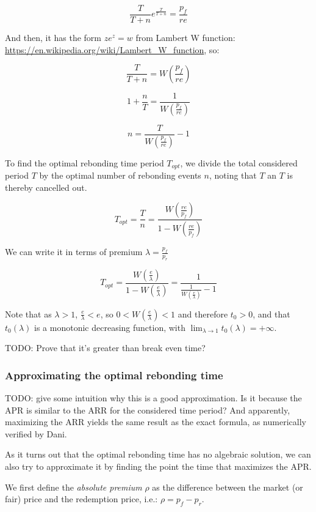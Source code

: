 \documentclass{article}
\begin{document}
\[
\frac{T}{T+n} e^{\frac{T}{T+n}} = \frac{p_f}{re} 
\]

And then, it has the form $z e^z = w$ from Lambert W function: \url{https://en.wikipedia.org/wiki/Lambert_W_function}, so:

\[
\frac{T}{T+n} = W\left(\frac{p_f}{re} \right)
\]

\[
1 + \frac{n}{T} = \frac{1}{W\left(\frac{p_f}{re} \right)}
\]

\[
n = \frac{T}{W\left(\frac{p_f}{re} \right)} - 1
\]

To find the optimal rebonding time period $T_{opt}$, we divide the total considered period $T$ by the optimal number of rebonding events $n$, noting that $T$ an $T$ is thereby cancelled out.

\begin{equation}
  \label{}
T_{opt} = \frac{T}{n} = \frac{W\left(\frac{re}{p_f}\right)}{1 - W\left(\frac{re}{p_f}\right)}
\end{equation}

We can write it in terms of premium $\lambda = \frac{p_f}{p_r}$

\begin{equation}
  \label{eq:opt-rebonding}
T_{opt} = \frac{W\left(\frac{e}{\lambda}\right)}{1 - W\left(\frac{e}{\lambda}\right)} = \frac{1}{\frac{1}{W\left(\frac{e}{\lambda}\right)} - 1}
\end{equation}

Note that as $\lambda > 1$, $\frac{e}{\lambda} < e$, so $0 < W(\frac{e}{\lambda}) < 1$ and therefore $t_0 > 0$, and that $t_0(\lambda)$ is a monotonic decreasing function, with $\lim_{\lambda \rightarrow 1}t_0(\lambda) = +\infty$.


TODO: Prove that it’s greater than break even time?

\subsubsection{Approximating the optimal rebonding time}
TODO: give some intuition why this is a good approximation. Is it because the APR is similar to the ARR for the considered time period? And apparently, maximizing the ARR yields the same result as the exact formula, as numerically verified by Dani.

As it turns out that the optimal rebonding time has no algebraic solution, we can also try to approximate it by finding the point the time that maximizes the APR.

We first define the \textit{absolute premium} $\rho$ as the difference between the market (or fair) price and the redemption price, i.e.: $\rho = p_f - p_r$.
\end{document}
